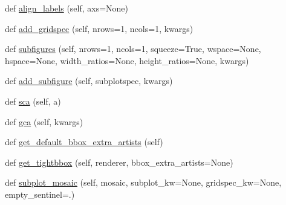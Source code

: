 \begin{DoxyCompactItemize}
def \hyperlink{classmatplotlib_1_1figure_1_1FigureBase_aecb3c8516a9b751cf15eb86480ef56a6}{align\+\_\+labels} (self, axs=None)
\item 
def \hyperlink{classmatplotlib_1_1figure_1_1FigureBase_a431e550a98fe4a303733cce35e19364d}{add\+\_\+gridspec} (self, nrows=1, ncols=1, kwargs)
\item 
def \hyperlink{classmatplotlib_1_1figure_1_1FigureBase_abc0fc14d197f3350f8264f1f05db9b29}{subfigures} (self, nrows=1, ncols=1, squeeze=True, wspace=None, hspace=None, width\+\_\+ratios=None, height\+\_\+ratios=None, kwargs)
\item 
def \hyperlink{classmatplotlib_1_1figure_1_1FigureBase_aa6e0344bfbfade6f80cb88990bccd467}{add\+\_\+subfigure} (self, subplotspec, kwargs)
\item 
def \hyperlink{classmatplotlib_1_1figure_1_1FigureBase_a5a8e3e15ea99ca07532bffeabdd2e74a}{sca} (self, a)
\item 
def \hyperlink{classmatplotlib_1_1figure_1_1FigureBase_a20964fa874e011f28516747589b10e20}{gca} (self, kwargs)
\item 
def \hyperlink{classmatplotlib_1_1figure_1_1FigureBase_a48513f9b12cb26d3953a44a1f08a75ae}{get\+\_\+default\+\_\+bbox\+\_\+extra\+\_\+artists} (self)
\item 
def \hyperlink{classmatplotlib_1_1figure_1_1FigureBase_a12bafe0169672824bbc89803726d70f4}{get\+\_\+tightbbox} (self, renderer, bbox\+\_\+extra\+\_\+artists=None)
\item 
def \hyperlink{classmatplotlib_1_1figure_1_1FigureBase_ad67a36dbb6f1968bff4a30e38d2e9cc2}{subplot\+\_\+mosaic} (self, mosaic, subplot\+\_\+kw=None, gridspec\+\_\+kw=None, empty\+\_\+sentinel=\textquotesingle{}.\textquotesingle{})
\end{DoxyCompactItemize}
